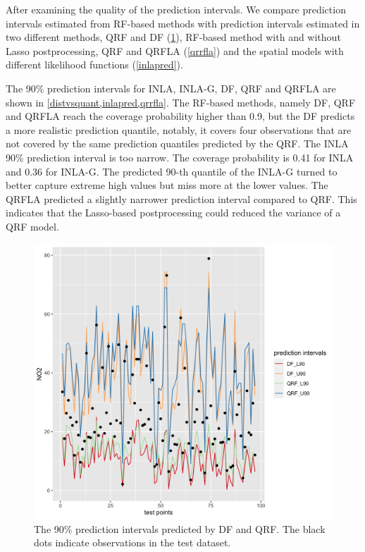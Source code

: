 \documentclass{article}
\begin{document}
After examining the quality of the prediction intervals. We compare prediction intervals estimated from RF-based methods with prediction intervals estimated in two different methods, QRF and DF (\cref{distvsquant}), RF-based method with and without Lasso postprocessing, QRF and QRFLA (\cref{qrrfla}) and the spatial models with different likelihood functions (\cref{inlapred}). 
 
The 90\% prediction intervals for INLA, INLA-G, DF, QRF and QRFLA are shown in \cref{distvsquant,inlapred,qrrfla}. The RF-based methods, namely DF, QRF and QRFLA reach the coverage probability higher than 0.9, but the DF predicts a more realistic prediction quantile, notably, it covers four observations that are not covered by the same prediction quantiles predicted by the QRF. The INLA 90\% prediction interval is too narrow. The coverage probability is 0.41 for INLA and 0.36 for INLA-G. The predicted 90-th quantile of the INLA-G turned to better capture extreme high values but miss more at the lower values. The QRFLA predicted a slightly narrower prediction interval compared to QRF. This indicates that the Lasso-based postprocessing could reduced the variance of a QRF model.  

\label{sec:predinterval}
\begin{figure}
\centering
\includegraphics[scale = 0.2]{fig/qrf_df.png}
\caption{The 90\% prediction intervals predicted by DF and QRF. The black dots indicate observations in the test dataset.}
\label{distvsquant}
\end{figure}
\end{document}
